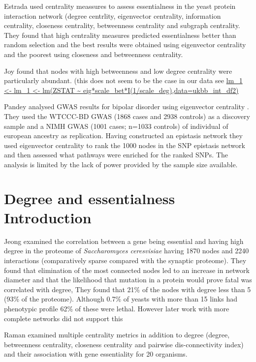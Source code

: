 Estrada \cite{estrada2006virtual} used centrality meassures to assess essentialness in the yeast protein interaction network (degree centrlity, eigenvector centrality, information centrality, closeness centrality, betweenness centrality and subgraph centrality. They found that high centrality measures predicted essentialness better than random selection and  the best results were obtained using eigenvector centrality and the poorest using closeness and betweenness centrality. 

Joy found that nodes with high betweenness and low degree centrality were particularly abundant.\cite{joy2005high} (this does not seem to be the case in our data see \url{lm_1 <- lm_1 <- lm(ZSTAT ~  eig*scale_bet*I(1/scale_deg),data=ukbb_int_df2)}

Pandey analysed GWAS results for bipolar disorder using eigenvector centrality \cite{pandey2012epistasis}. They used the WTCCC-BD GWAS (1868 cases and 2938 controls) as a discovery sample and  a NIMH GWAS (1001 cases; n=1033 controls) of individual of european ancestry as replication. Having constructed an epistasis network they used eigenvector centrality to rank the 1000 nodes in the SNP epistasis network and then assessed what pathways were enriched for the ranked SNPs. The analysis is limited by the lack of power provided by the sample size available.

\section{Degree and essentialness Introduction}
\label{sec:Degree and essentialness}
Jeong \cite{jeong2001lethality} examined the correlation between a gene being essential and having high degree in the proteome of \textit{Saccharomyces ceresvisiae} having 1870 nodes and 2240 interactions (comparatively sparse compared with the synaptic proteome). They found that elimination of the most connected nodes led to an increase in network diameter and that the likelihood that mutation in a protein would prove fatal was correlated with degree, They found that 21\% of the nodes with degree less than 5 (93\% of the proteome). Although 0.7\% of yeasts with more than 15 links had phenotypic profile 62\% of these were lethal. However later work with more complete networks did not support this \cite{milenkovic2011dominating} \cite{yu2008high}


Raman \cite{raman2014organisational} examined multiple centrality metrics in addition to degree (degree, betweenness centrality, closeness centrality and pairwise dis-connectivity index) and their association with gene essentiality for 20 organisms.

